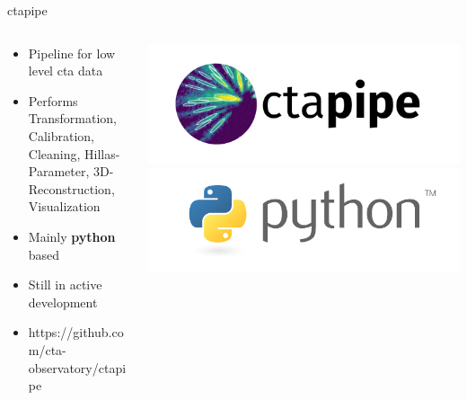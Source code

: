 \begin{frame}{ctapipe}
    \begin{columns}[T] %
        \begin{column}{.45\textwidth}
            \vspace{10pt}
            \begin{itemize}
                \item { Pipeline for low level cta data}
                \item { Performs Transformation, Calibration, Cleaning, 
                        Hillas-Parameter, 3D-Reconstruction, Visualization}
                \item { Mainly \textbf{python} based}
                \item { Still in active development} 
                \item { https://github.com/cta-observatory/ctapipe}
            \end{itemize}
        \end{column}
        \begin{column}{.48\textwidth}
            \includegraphics[width=\linewidth]{images/ctapipe_logo.png}
            \includegraphics[width=\linewidth]{images/python_logo.png}
        \end{column}
    \end{columns}
\end{frame}
